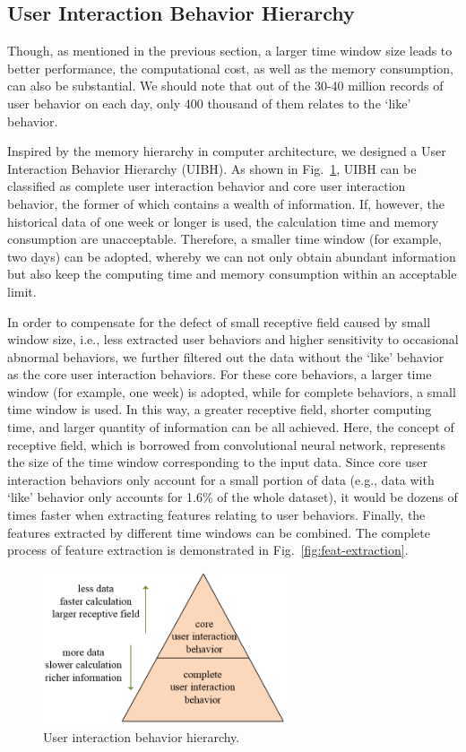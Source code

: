 \documentclass{article}
\begin{document}
\subsection{User Interaction Behavior Hierarchy}
\label{sec:user-interaction-behavior-hierarchy}

Though, as mentioned in the previous section, a larger time window size leads to better performance, the computational cost, as well as the memory consumption, can also be substantial. We should note that out of the 30-40 million records of user behavior on each day, only 400 thousand of them relates to the ‘like’ behavior.

Inspired by the memory hierarchy in computer architecture, we designed a User Interaction Behavior Hierarchy (UIBH).
As shown in Fig.~\ref{fig:user-inter-behav-hierachy}, UIBH can be classified as complete user interaction behavior and core user interaction behavior, the former of which contains a wealth of information.
If, however, the historical data of one week or longer is used, the calculation time and memory consumption are unacceptable.
Therefore, a smaller time window (for example, two days) can be adopted, whereby we can not only obtain abundant information but also keep the computing time and memory consumption within an acceptable limit.

In order to compensate for the defect of small receptive field caused by small window size, i.e., less extracted user behaviors and higher sensitivity to occasional abnormal behaviors, we further filtered out the data without the ‘like’ behavior as the core user interaction behaviors.
For these core behaviors, a larger time window (for example, one week) is adopted, while for complete behaviors, a small time window is used.
In this way, a greater receptive field, shorter computing time, and larger quantity of information can be all achieved. Here, the concept of receptive field, which is borrowed from convolutional neural network, represents the size of the time window corresponding to the input data.
Since core user interaction behaviors only account for a small portion of data (e.g., data with ‘like’ behavior only accounts for 1.6\% of the whole dataset), it would be dozens of times faster when extracting features relating to user behaviors.
Finally, the features extracted by different time windows can be combined. The complete process of feature extraction is demonstrated in Fig.~\ref{fig:feat-extraction}.

\begin{figure}[h]
  \centering
  \includegraphics[width=7.2cm]{media/user-inter-behav-hierachy}
  \caption{User interaction behavior hierarchy.}
  \label{fig:user-inter-behav-hierachy}
\end{figure}
\end{document}
